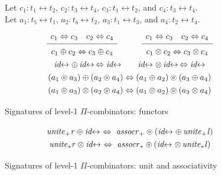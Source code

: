 \documentclass{article}
\newcommand{\identlp}{\mathit{unite}_+\mathit{l}}
\newcommand{\identlsp}{\mathit{unite}_+\mathit{r}}
\newcommand{\assocrp}{\mathit{assocr}_+}
\newcommand{\identlt}{\mathit{unite}_*\mathit{l}}
\newcommand{\identlst}{\mathit{unite}_*\mathit{r}}
\newcommand{\assocrt}{\mathit{assocr}_*}
\newcommand{\idc}{\mathit{id}\!\!\leftrightarrow}
\newcommand{\Rule}[4]{
\makebox{{\rm #1}
$\displaystyle
\frac{\begin{array}{l}#2 \\\end{array}}
{\begin{array}{l}#3      \\\end{array}}$
 #4}}
\begin{document}
\begin{figure}[t]
Let $c_1 : t_1 \leftrightarrow t_2$, $c_2 : t_3 \leftrightarrow t_4$, $c_3 : t_1 \leftrightarrow t_2$, and $c_4 : t_3 \leftrightarrow t_4$. \\
Let $a_1 : t₅ \leftrightarrow t_1$,  $a_2 : t₆ \leftrightarrow t_2$, $a_3 : t_1 \leftrightarrow t_3$, and $a_4 : t_2 \leftrightarrow t_4$.
\[\def\arraystretch{1.3}
\begin{array}{c}
\Rule{}
  {c_1 \Leftrightarrow c_3 \quad c_2 \Leftrightarrow c_4}
  {c_1 \oplus c_2 \Leftrightarrow c_3 \oplus c_4}
  {}
\qquad
\Rule{}
  {c_1 \Leftrightarrow c_3 \quad c_2 \Leftrightarrow c_4}
  {c_1 \otimes c_2 \Leftrightarrow c_3 \otimes c_4}
  {} 
\\
  {\idc \oplus \, \idc \, \Leftrightarrow \idc}
\qquad
  {\idc \otimes \, \idc \, \Leftrightarrow \idc}
\\
  {(a_1 \circledcirc a_3) \oplus (a_2 \circledcirc a_4) \Leftrightarrow (a_1 \oplus a_2) \circledcirc (a_3 \oplus a_4)}
\\
  {(a_1 \circledcirc a_3) \otimes (a_2 \circledcirc a_4) \Leftrightarrow (a_1 \otimes a_2) \circledcirc (a_3 \otimes a_4)}
\end{array}\]
\caption{\label{fige}Signatures of level-1 $\Pi$-combinators: functors}
\end{figure}

\begin{figure}[t]
\[\def\arraystretch{1.3}
\begin{array}{c}
  {\identlsp \oplus \idc ~\Leftrightarrow~ \assocrp \circledcirc (\idc \oplus \, \identlp)}
\\
  {\identlst \otimes \idc ~\Leftrightarrow~ \assocrt \circledcirc (\idc \otimes \, \identlt)}
\end{array}\]
\caption{\label{figd}Signatures of level-1 $\Pi$-combinators: unit and associativity}
\end{figure}
\end{document}
